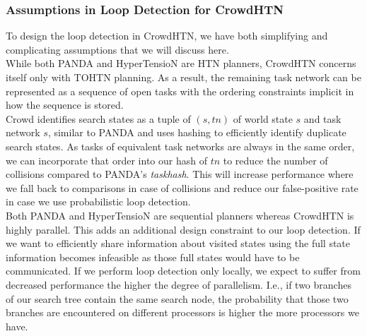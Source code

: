\subsubsection{Assumptions in Loop Detection for CrowdHTN}
\label{ld - tohtn simplifications}
To design the loop detection in CrowdHTN, we have both simplifying and complicating assumptions that we will discuss here. \\
While both PANDA and HyperTensioN are HTN planners, CrowdHTN concerns itself only with TOHTN planning. As a result, the remaining task network can be represented as a sequence of open tasks with the ordering constraints implicit in how the sequence is stored.
 \\
Crowd identifies search states as a tuple of $(s, tn)$ of world state $s$ and task network $s$, similar to PANDA and uses hashing to efficiently identify duplicate search states. As tasks of equivalent task networks are always in the same order, we can incorporate that order into our hash of $tn$ to reduce the number of collisions compared to PANDA's \textit{taskhash}. This will increase performance where we fall back to comparisons in case of collisions and reduce our false-positive rate in case we use probabilistic loop detection. 
 \\
Both PANDA and HyperTensioN are sequential planners whereas CrowdHTN is highly parallel. This adds an additional design constraint to our loop detection. If we want to efficiently share information about visited states using the full state information becomes infeasible as those full states would have to be communicated. If we perform loop detection only locally, we expect to suffer from decreased performance the higher the degree of parallelism. I.e., if two branches of our search tree contain the same search node, the probability that those two branches are encountered on different processors is higher the more processors we have.
\begin{comment}
	- keep the part where we store loop detection information externally
	- be sure we can always assume total order (and keep the ordering information to reduce false-positive rate!)
	- keep completeness of the planner
	- improve on the performance for hashing!
\end{comment}

